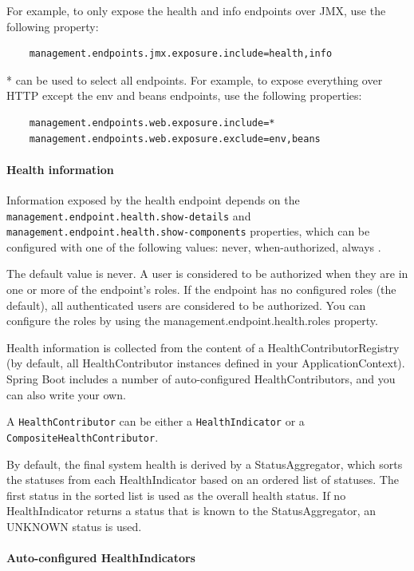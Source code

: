\documentclass{scrartcl}
\begin{document}
For example, to only expose the health and info endpoints over JMX, use the following property:

\begin{lstlisting}
    management.endpoints.jmx.exposure.include=health,info
\end{lstlisting}

* can be used to select all endpoints. For example, to expose everything over HTTP except the env and beans endpoints, use the following properties:

\begin{lstlisting}
    management.endpoints.web.exposure.include=*
    management.endpoints.web.exposure.exclude=env,beans

\end{lstlisting}

\paragraph{Health information}

Information exposed by the health endpoint depends on the \lstinline|management.endpoint.health.show-details| and \lstinline|management.endpoint.health.show-components| properties, which can be configured with one of the following values: never, when-authorized, always
.

The default value is never. A user is considered to be authorized when they are in one or more of the endpoint’s roles. If the endpoint has no configured roles (the default), all authenticated users are considered to be authorized. You can configure the roles by using the management.endpoint.health.roles property.

Health information is collected from the content of a HealthContributorRegistry (by default, all HealthContributor instances defined in your ApplicationContext). Spring Boot includes a number of auto-configured HealthContributors, and you can also write your own.

A \lstinline|HealthContributor| can be either a \lstinline|HealthIndicator| or a \lstinline|CompositeHealthContributor|.

By default, the final system health is derived by a StatusAggregator, which sorts the statuses from each HealthIndicator based on an ordered list of statuses. The first status in the sorted list is used as the overall health status. If no HealthIndicator returns a status that is known to the StatusAggregator, an UNKNOWN status is used.

\paragraph{Auto-configured HealthIndicators}
\end{document}
